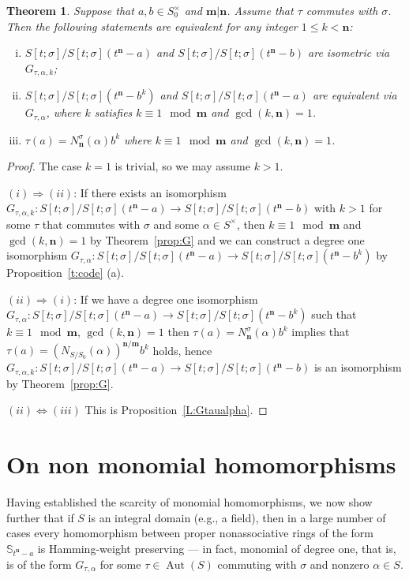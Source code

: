 \documentclass[11pt]{amsart}
\theoremstyle{plain}
\newtheorem{theorem}{Theorem}[section]
\theoremstyle{definition}
\numberwithin{equation}{section}
\numberwithin{figure}{section}
\newcommand{\Sone}[1]{\Stsigma/\Stsigma (t^{\de}-#1)} %
\newcommand{\ring}{S}
\newcommand{\Stsigma}{S[t;\sigma]}
\newcommand{\os}{\mathbf{m}}  %
\newcommand{\de}{\mathbf{n}}  %
\DeclareMathOperator{\Aut}{Aut}
\begin{document}
\begin{theorem}\label{t:Ouazzou}
Suppose that $a,b\in S_0^\times$ and $\os|\de$.
 Assume that $\tau$ commutes with $\sigma$.
Then the following statements are equivalent for any integer $1\leq k<\de$:
\begin{enumerate}[(i)]
\item $\Sone{a}$ and $\Sone{b}$
are isometric via $G_{\tau,\alpha,k}$;
\item $\Sone{b^k}$ and $\Sone{a}$
are equivalent via $G_{\tau,\alpha}$, where $k$ satisfies $k\equiv 1 \mod \os$ and $\gcd(k,\de)=1$.

\item  $\tau(a)=N_{\de}^\sigma(\alpha)  b^k$ where $k\equiv 1 \mod \os$ and  $\gcd(k,\de)=1$.
\end{enumerate}
\end{theorem}

\begin{proof}
The case $k=1$ is trivial, so we may assume $k>1$.

\noindent $(i) \Rightarrow (ii)$: If there exists an isomorphism
  $G_{\tau,\alpha,k}:\Sone{a}\to\Sone{b}$  with $k>1$ for some $\tau$ that commutes with $\sigma$ and some $\alpha\in \ring^\times$,  then
  $k\equiv 1 \mod \os$ and $\gcd(k,\de)=1$ by Theorem~\ref{prop:G} and
  we can construct a degree one isomorphism  $G_{\tau,\alpha}:\Sone{a}\to\Sone{b^k}$ by Proposition~\ref{t:code} (a).

  \noindent $(ii) \Rightarrow (i)$: If we have a degree one isomorphism  $G_{\tau,\alpha}:\Sone{a}\to\Sone{b^k}$
  such that $k\equiv 1 \mod \os$,  $\gcd(k,\de)=1$
  then $\tau(a)=N_{\de}^\sigma(\alpha)  b^k$
  implies that $\tau(a)=(N_{\ring/\ring_0}(\alpha))^{\de/\os}b^k$ holds,  hence $G_{\tau,\alpha,k}:\Sone{a}\to\Sone{b}$ is an isomorphism by Theorem~\ref{prop:G}.

  \noindent $(ii)\iff (iii)$ This is Proposition~\ref{L:Gtaualpha}.
\end{proof}



\section{On non monomial homomorphisms}\label{S:nonmonomial}


Having established the scarcity of monomial homomorphisms, we now show further that if $\ring$ is an integral domain (e.g., a field), then in a large number of cases every homomorphism between proper nonassociative rings of the form $\mathbb{S}_{t^\de-a}$ %
is Hamming-weight preserving --- in fact, monomial of degree one, that is, is of the form $G_{\tau,\alpha}$ for some $\tau\in \Aut(\ring)$ commuting with $\sigma$ and nonzero $\alpha \in \ring$.
\end{document}
